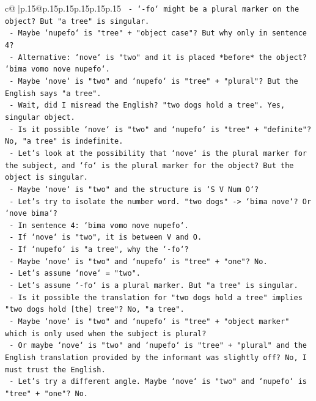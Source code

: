 \documentclass{article}
\begin{document}
{\begin{supertabular}{c@{$\;$}|p{.15\linewidth}@{}p{.15\linewidth}p{.15\linewidth}p{.15\linewidth}p{.15\linewidth}p{.15\linewidth}}
{{{\texttt{     {-} `{-}fo` might be a plural marker on the object? But "a tree" is singular.} \\
\texttt{     {-} Maybe `nupefo` is "tree" + "object case"? But why only in sentence 4?} \\
\texttt{     {-} Alternative: `nove` is "two" and it is placed *before* the object? `bima vomo nove nupefo`.} \\
\texttt{     {-} Maybe `nove` is "two" and `nupefo` is "tree" + "plural"? But the English says "a tree".} \\
\texttt{     {-} Wait, did I misread the English? "two dogs hold a tree". Yes, singular object.} \\
\texttt{     {-} Is it possible `nove` is "two" and `nupefo` is "tree" + "definite"? No, "a tree" is indefinite.} \\
\texttt{     {-} Let's look at the possibility that `nove` is the plural marker for the subject, and `fo` is the plural marker for the object? But the object is singular.} \\
\texttt{     {-} Maybe `nove` is "two" and the structure is `S V Num O`?} \\
\texttt{     {-} Let's try to isolate the number word. "two dogs" {-}> `bima nove`? Or `nove bima`?} \\
\texttt{     {-} In sentence 4: `bima vomo nove nupefo`.} \\
\texttt{     {-} If `nove` is "two", it is between V and O.} \\
\texttt{     {-} If `nupefo` is "a tree", why the `{-}fo`?} \\
\texttt{     {-} Maybe `nove` is "two" and `nupefo` is "tree" + "one"? No.} \\
\texttt{     {-} Let's assume `nove` = "two".} \\
\texttt{     {-} Let's assume `{-}fo` is a plural marker. But "a tree" is singular.} \\
\texttt{     {-} Is it possible the translation for "two dogs hold a tree" implies "two dogs hold {[}the{]} tree"? No, "a tree".} \\
\texttt{     {-} Maybe `nove` is "two" and `nupefo` is "tree" + "object marker" which is only used when the subject is plural?} \\
\texttt{     {-} Or maybe `nove` is "two" and `nupefo` is "tree" + "plural" and the English translation provided by the informant was slightly off? No, I must trust the English.} \\
\texttt{     {-} Let's try a different angle. Maybe `nove` is "two" and `nupefo` is "tree" + "one"? No.} \\
}}}
\end{supertabular}}
\end{document}
